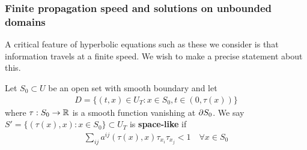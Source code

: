 \documentclass[12pt,a4paper]{report}
\begin{document}
\subsubsection*{Finite propagation speed and solutions on unbounded domains}

A critical feature of hyperbolic equations such as these we consider is that information travels at a finite speed. We wish to make a precise statement about this.

\quad Let $S_0 \subset U$ be an open set with smooth boundary and let
\begin{align*}
D = \{ (t,x) \in U_T : x\in S_0, t\in (0, \tau(x)) \}
\end{align*}
where $\tau : S_0 \rightarrow \mathbb{R}$ is a smooth function vanishing at $\partial S_0$. We say $S' = \{ (\tau(x), x) : x\in S_0 \} \subset U_T$ is \textbf{space-like} if 
\begin{align*}
\sum_{ij} a^{ij} (\tau(x),x) \tau_{x_i} \tau_{x_j} < 1 \quad \forall x\in S_0
\end{align*}
\s
\end{document}
